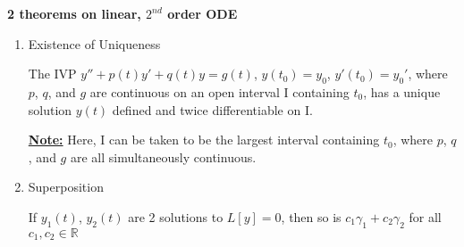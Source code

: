 \redhline
\begin{center}
	\Large \textbf{2 theorems on linear, $2^{nd}$ order ODE}
\end{center}
\redhline
\begin{enumerate}[label=\protect\circled{\Roman*}]
	\item Existence of Uniqueness
	\begin{theorem}
		The IVP $y'' + p(t)y' + q(t)y = g(t)$, $y(t_0) = y_0$, $y'(t_0) = y_0'$, where $p$, $q$, and $g$ are continuous on an open interval I containing $t_0$, has a unique solution $y(t)$ defined and twice differentiable on I.
	\end{theorem}
	\underline{\textbf{Note:}} Here, I can be taken to be the largest interval containing $t_0$, where $p$, $q$, and $g$ are all simultaneously continuous.
	\item Superposition
	\begin{theorem}
		If $y_1(t)$, $y_2(t)$ are 2 solutions to $L[y] = 0$, then so is $c_1\gamma_1 + c_2\gamma_2$ for all $c_1, c_2 \in \mathbb{R}$
	\end{theorem}
\end{enumerate}

